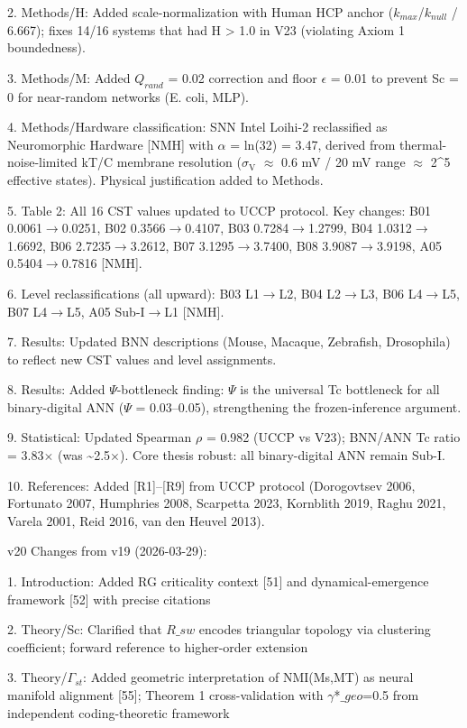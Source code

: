 \documentclass[a4paper,12pt]{article}
\begin{document}
2. Methods/H: Added scale-normalization with Human HCP anchor ($k_{max}$/$k_{null}$ / 6.667); fixes 14/16 systems that had H > 1.0 in V23 (violating Axiom 1 boundedness).

3. Methods/M: Added $Q_{rand}$ = 0.02 correction and floor $\epsilon$ = 0.01 to prevent Sc = 0 for near-random networks (E. coli, MLP).

4. Methods/Hardware classification: SNN Intel Loihi-2 reclassified as Neuromorphic Hardware [NMH] with $\alpha$ = ln(32) = 3.47, derived from thermal-noise-limited kT/C membrane resolution ($\sigma_{\text{V}}$ $\approx$ 0.6 mV / 20 mV range $\approx$ 2^5 effective states). Physical justification added to Methods.

5. Table 2: All 16 CST values updated to UCCP protocol. Key changes: B01 0.0061$\rightarrow$0.0251, B02 0.3566$\rightarrow$0.4107, B03 0.7284$\rightarrow$1.2799, B04 1.0312$\rightarrow$1.6692, B06 2.7235$\rightarrow$3.2612, B07 3.1295$\rightarrow$3.7400, B08 3.9087$\rightarrow$3.9198, A05 0.5404$\rightarrow$0.7816 [NMH].

6. Level reclassifications (all upward): B03 L1$\rightarrow$L2, B04 L2$\rightarrow$L3, B06 L4$\rightarrow$L5, B07 L4$\rightarrow$L5, A05 Sub-I$\rightarrow$L1 [NMH].

7. Results: Updated BNN descriptions (Mouse, Macaque, Zebrafish, Drosophila) to reflect new CST values and level assignments.

8. Results: Added $\Psi$-bottleneck finding: $\Psi$ is the universal Tc bottleneck for all binary-digital ANN ($\Psi$ = 0.03--0.05), strengthening the frozen-inference argument.

9. Statistical: Updated Spearman $\rho$ = 0.982 (UCCP vs V23); BNN/ANN Tc ratio = 3.83$\times$ (was \textasciitilde{}2.5$\times$). Core thesis robust: all binary-digital ANN remain Sub-I.

10. References: Added [R1]--[R9] from UCCP protocol (Dorogovtsev 2006, Fortunato 2007, Humphries 2008, Scarpetta 2023, Kornblith 2019, Raghu 2021, Varela 2001, Reid 2016, van den Heuvel 2013).

v20 Changes from v19 (2026-03-29):

1. Introduction: Added RG criticality context [51] and dynamical-emergence framework [52] with precise citations

2. Theory/Sc: Clarified that $R\_{sw}$ encodes triangular topology via clustering coefficient; forward reference to higher-order extension

3. Theory/$\Gamma_{st}$: Added geometric interpretation of NMI(Ms,MT) as neural manifold alignment [55]; Theorem 1 cross-validation with $\gamma$*$\_geo$=0.5 from independent coding-theoretic framework
\end{document}
